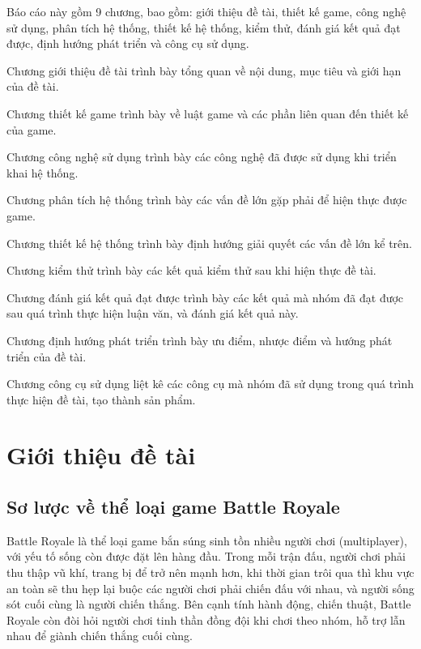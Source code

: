 \documentclass[12pt,a4paper]{article}
\begin{document}
  Báo cáo này gồm 9 chương, bao gồm: giới thiệu đề tài, thiết kế game, công nghệ sử dụng, phân tích hệ thống, thiết kế hệ thống, kiểm thử, đánh giá kết quả đạt được, định hướng phát triển và công cụ sử dụng.
  
  Chương giới thiệu đề tài trình bày tổng quan về nội dung, mục tiêu và giới hạn của đề tài.

  Chương thiết kế game trình bày về luật game và các phần liên quan đến thiết kế của game.
  
  Chương công nghệ sử dụng trình bày các công nghệ đã được sử dụng khi triển khai hệ thống.
  
  Chương phân tích hệ thống trình bày các vấn đề lớn gặp phải để hiện thực được game.
  
  Chương thiết kế hệ thống trình bày định hướng giải quyết các vấn đề lớn kể trên.

  Chương kiểm thử trình bày các kết quả kiểm thử sau khi hiện thực đề tài.

  Chương đánh giá kết quả đạt được trình bày các kết quả mà nhóm đã đạt được sau quá trình thực hiện luận văn, và đánh giá kết quả này.
  
  Chương định hướng phát triển trình bày ưu điểm, nhược điểm và hướng phát triển của đề tài.

  Chương công cụ sử dụng liệt kê các công cụ mà nhóm đã sử dụng trong quá trình thực hiện đề tài, tạo thành sản phẩm.
  
  \newpage
  \tableofcontents
  
  \newpage
  \renewcommand\listfigurename{Danh sách hình ảnh}
  \listoffigures
  
  \newpage
  \listoftables
  
  \newpage
  \section{Giới thiệu đề tài}
  \subsection{Sơ lược về thể loại game Battle Royale}

  Battle Royale là thể loại game bắn súng sinh tồn nhiều người chơi (multiplayer), với yếu tố sống còn được đặt lên hàng đầu. Trong mỗi trận đấu, người chơi phải thu thập vũ khí, trang bị để trở nên mạnh hơn, khi thời gian trôi qua thì khu vực an toàn sẽ thu hẹp lại buộc các người chơi phải chiến đấu với nhau, và người sống sót cuối cùng là người chiến thắng. Bên cạnh tính hành động, chiến thuật, Battle Royale còn đòi hỏi người chơi tinh thần đồng đội khi chơi theo nhóm, hỗ trợ lẫn nhau để giành chiến thắng cuối cùng.
\end{document}
